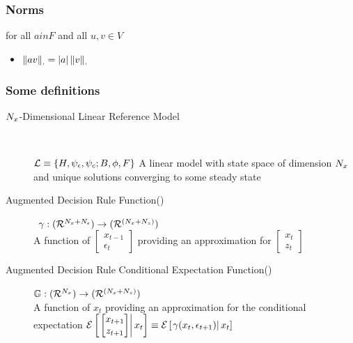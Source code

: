 \documentclass[tikz]{beamer}
\begin{document}
\begin{frame}
  \frametitle{Norms}

for all $a in F$  and all $u, v \in V$
  \begin{itemize}
  \item $\left\lVert a v\right\rVert_\cdot = |a| \left\lVert v\right\rVert_\cdot$
  \end{itemize}
\end{frame}


\begin{frame}
  \frametitle{Some definitions}

{\small

  \begin{description}
  \item[${N_x}$-Dimensional Linear Reference Model] \ 

${\mathcal{L}} \equiv {\{H,\psi_\epsilon,\psi_c;B,\phi,F\}}$ A linear model with state space of dimension
${N_x}$ and unique solutions converging 
to some steady state
  \item[Augmented Decision Rule Function(\ADR)]  \ 
${{\gamma}}: {({\mathcal{R}^{{N_x}+{N_\epsilon}}})\rightarrow ({\mathcal{R}^{({{N_x}+{N_z}})}})}$ \\
 A function of $
\begin{bmatrix}
  x_{t-1}\\\epsilon_t
\end{bmatrix}
$ providing an approximation 
for $\begin{bmatrix}
  x_t\\z_t
\end{bmatrix}$
  \item[Augmented Decision Rule Conditional Expectation Function(\ADRCE)] 

${\mathbb{G}}: {({\mathcal{R}^{{N_x}}})\rightarrow ({\mathcal{R}^{({{N_x}+{N_z}})}})}$ \\ A function of $x_t$ providing an approximation 
for the conditional expectation  
${\mathcal{E}\left [ \left . \begin{bmatrix}
  x_{t+1}\\z_{t+1}
\end{bmatrix} \right | x_t \right ]}\equiv  {\mathcal{E}\left [ \left . {{\gamma}}(x_t,\epsilon_{t+1}) \right | x_t \right ]}$

  \end{description}

}

\end{frame}
\end{document}
